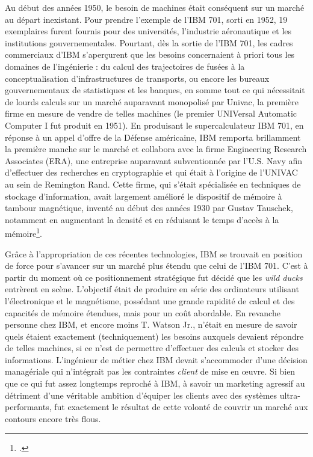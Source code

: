 \documentclass{FramateX}
\begin{document}
\begin{refsection}
\begin{quote}
\end{quote}
Au début des années 1950, le besoin de machines était conséquent sur un
marché au départ inexistant. Pour prendre l'exemple de
l'IBM 701, sorti en 1952, 19 exemplaires furent
fournis pour des universités, l'industrie aéronautique
et les institutions gouvernementales. Pourtant, dès la sortie de
l'IBM 701, les cadres commerciaux
d'IBM s'aperçurent que les besoins
concernaient à priori tous les domaines de
l'ingénierie : du calcul des trajectoires de fusées à
la conceptualisation d'infrastructures de transports,
ou encore les bureaux gouvernementaux de statistiques et les banques,
en somme tout ce qui nécessitait de lourds calculs sur un marché
auparavant monopolisé par Univac, la première firme en mesure de vendre
de telles machines (le premier UNIVersal Automatic Computer I fut
produit en 1951). En produisant le supercalculateur IBM 701, en réponse
à un appel d'offre de la Défense américaine, IBM
remporta brillamment la première manche sur le marché et collabora avec
la firme Engineering Research Associates (ERA), une entreprise
auparavant subventionnée par l'U.S. Navy afin
d'effectuer des recherches en cryptographie et qui
était à l'origine de l'UNIVAC au sein
de Remington Rand. Cette firme, qui s'était
spécialisée en techniques de stockage d'information,
avait largement amélioré le dispositif de mémoire à tambour magnétique,
inventé au début des années 1930 par Gustav Tauschek, notamment en
augmentant la densité et en réduisant le temps d'accès
à la mémoire\footnote{\cite{tomashbirth1979}.}.

Grâce à l'appropriation de ces récentes technologies,
IBM se trouvait en position de force pour s'avancer
sur un marché plus étendu que celui de l'IBM 701.
C'est à partir du moment où ce positionnement
stratégique fut décidé que les \textit{wild ducks} entrèrent en scène.
L'objectif était de produire en série des ordinateurs
utilisant l'électronique et le magnétisme, possédant
une grande rapidité de calcul et des capacités de mémoire étendues,
mais pour un coût abordable. En revanche personne chez IBM, et encore
moins T. Watson Jr., n'était en mesure de savoir quels
étaient exactement (techniquement) les besoins auxquels devaient
répondre de telles machines, si ce n'est de permettre
d'effectuer des calculs et stocker des informations.
L'ingénieur de métier chez IBM devait
s'accommoder d'une décision
managériale qui n'intégrait pas les contraintes
\textit{client} de mise en œuvre. Si bien que ce qui fut assez
longtemps reproché à IBM, à savoir un marketing agressif au détriment
d'une véritable ambition d'équiper
les clients avec des systèmes ultra-performants, fut exactement le
résultat de cette volonté de couvrir un marché aux contours encore très
flous.


\end{refsection}
\end{document}
